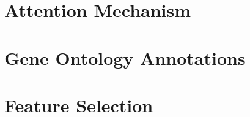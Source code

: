 \documentclass[
	fontsize=10pt, %
	twoside=false, %
	secnumdepth=1, %
  toc=indentunnumbered %
]{kaobook}
\begin{document}





\section{Attention Mechanism}




\section{Gene Ontology Annotations}

















\section{Feature Selection}
\end{document}
